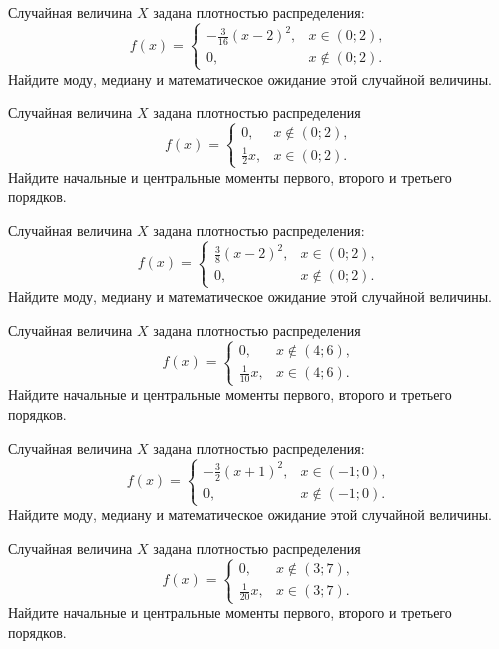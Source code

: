 \vfill

\newpage\setcounter{zad}{0}

\z Случайная величина $X$ задана плотностью распределения: $$f(x) = \begin{cases} -\frac{3}{16}(x-2)^2, & x \in (0; 2), \\ 0, & x \not\in (0; 2). \end{cases}$$ Найдите моду, медиану и математическое ожидание этой случайной величины.


\vfill

\z Случайная величина $X$ задана плотностью распределения $$f(x) = \begin{cases}0, & x\not\in(0; 2), \\ \frac{1}{2}x, & x\in(0; 2).\end{cases}$$ Найдите начальные и центральные моменты первого, второго и третьего порядков.
 

\vfill

\newpage\setcounter{zad}{0}

\z Случайная величина $X$ задана плотностью распределения: $$f(x) = \begin{cases} \frac{3}{8}(x-2)^2, & x \in (0; 2), \\ 0, & x \not\in (0; 2). \end{cases}$$ Найдите моду, медиану и математическое ожидание этой случайной величины.


\vfill

\z Случайная величина $X$ задана плотностью распределения $$f(x) = \begin{cases}0, & x\not\in(4; 6), \\ \frac{1}{10}x, & x\in(4; 6).\end{cases}$$ Найдите начальные и центральные моменты первого, второго и третьего порядков.
 

\vfill

\newpage\setcounter{zad}{0}

\z Случайная величина $X$ задана плотностью распределения: $$f(x) = \begin{cases} -\frac{3}{2}(x+1)^2, & x \in (-1; 0), \\ 0, & x \not\in (-1; 0). \end{cases}$$ Найдите моду, медиану и математическое ожидание этой случайной величины.


\vfill

\z Случайная величина $X$ задана плотностью распределения $$f(x) = \begin{cases}0, & x\not\in(3; 7), \\ \frac{1}{20}x, & x\in(3; 7).\end{cases}$$ Найдите начальные и центральные моменты первого, второго и третьего порядков.
 

